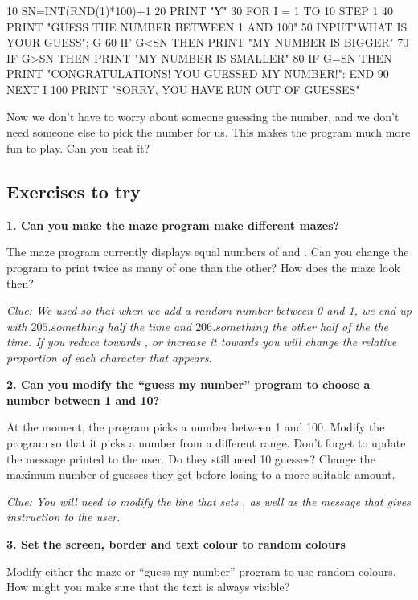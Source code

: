 \begin{screenoutput}
10 SN=INT(RND(1)*100)+1
20 PRINT "Ƴ"
30 FOR I = 1 TO 10 STEP 1
40 PRINT "GUESS THE NUMBER BETWEEN 1 AND 100"
50 INPUT"WHAT IS YOUR GUESS"; G
60 IF G<SN THEN PRINT "MY NUMBER IS BIGGER"
70 IF G>SN THEN PRINT "MY NUMBER IS SMALLER"
80 IF G=SN THEN PRINT "CONGRATULATIONS! YOU GUESSED MY NUMBER!": END
90 NEXT I
100 PRINT "SORRY, YOU HAVE RUN OUT OF GUESSES"
\end{screenoutput}

Now we don't have to worry about someone guessing the number, and we
don't need someone else to pick the number for us. This makes the
program much more fun to play.  Can you beat it?


\subsection{Exercises to try}

{\bf 1. Can you make the maze program make different mazes?}

The maze program currently displays equal numbers of {}
and {}. Can you change the program to print twice as
many of one than the other?  How does the maze look then?

{\em Clue: We used  so that when we add a random number
  between 0 and 1, we end up with $205.something$ half the time and
  $206.something$ the other half of the the time.  If you reduce
   towards , or increase it towards  you
  will change the relative proportion of each character that appears.}

{\bf 2. Can you modify the ``guess my number'' program to choose a
  number between 1 and 10?}

At the moment, the program picks a number between 1 and 100.  Modify
the program so that it picks a number from a different range. Don't
forget to update the message printed to the user.  Do they still need
10 guesses? Change the maximum number of guesses they get before
losing to a more suitable amount.

{\em Clue: You will need to modify the line that sets , as
  well as the  message that gives instruction to the user.}

{\bf 3. Set the screen, border and text colour to random colours}

Modify either the maze or ``guess my number'' program to use
random colours.  How might you make sure that the text is always
visible?

